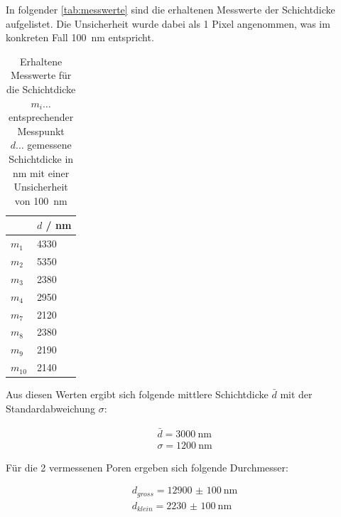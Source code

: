 \documentclass[12pt,english,ngerman]{scrartcl}
\begin{document}
In folgender \autoref{tab:messwerte} sind die erhaltenen Messwerte der Schichtdicke aufgelistet. Die Unsicherheit wurde dabei 
als 1 Pixel angenommen, was im konkreten Fall \SI{100}{\nano\m} entspricht.


\begin{table}[H]
	\caption[Erhaltene Messwerte für die Schichtdicke]{Erhaltene Messwerte für die Schichtdicke\\
	$m_i \dots$ entsprechender Messpunkt\\
	$d \dots$ gemessene Schichtdicke in nm mit einer Unsicherheit von \SI{100}{\nano\m}}
	\begin{center}
	\begin{tabular}{|l|l|}
	\hline
	                 & $d$ / nm         \\ \hline
	$m_{1}$          & \SI{4330}{}      \\ \hline
	$m_{2}$          & \SI{5350}{}      \\ \hline
	$m_{3}$          & \SI{2380}{}      \\ \hline
	$m_{4}$          & \SI{2950}{}      \\ \hline
	$m_{7}$          & \SI{2120}{}      \\ \hline
	$m_{8}$          & \SI{2380}{}      \\ \hline
	$m_{9}$          & \SI{2190}{}      \\ \hline
	$m_{10}$         & \SI{2140}{}      \\ \hline

	\end{tabular}
	\end{center}
	\label{tab:messwerte}
\end{table}


Aus diesen Werten ergibt sich folgende mittlere Schichtdicke $\bar{d}$ mit der Standardabweichung $\sigma$:

\begin{align*}
	\bar{d} = \SI{3000}{\nano\m} \\
	\sigma = \SI{1200}{\nano\m}
\end{align*}

Für die 2 vermessenen Poren ergeben sich folgende Durchmesser:

\begin{align*}
	d_{gross} = \SI{12900(100)}{\nano\m} \\
	d_{klein} = \SI{2230(100)}{\nano\m}
\end{align*}
\end{document}
